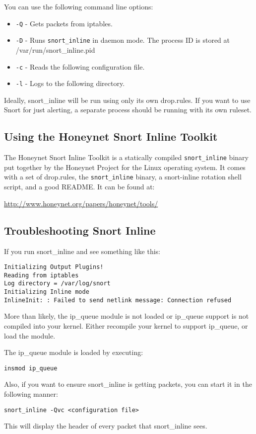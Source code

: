 \documentclass[english]{report}
\begin{document}
You can use the following command line options:
\begin{itemize}
\item \texttt{-Q} - Gets packets from iptables.
\item \texttt{-D} - Runs \texttt{snort\_inline} in daemon mode.  The process ID is stored
                    at /var/run/snort\_inline.pid
\item \texttt{-c} - Reads the following configuration file.
\item \texttt{-l} - Logs to the following directory.

\end{itemize}

Ideally, snort\_inline will be run using only its own drop.rules.  If
you want to use Snort for just alerting, a separate process should be
running with its own ruleset.

\subsection{Using the Honeynet Snort Inline Toolkit}

The Honeynet Snort Inline Toolkit is a statically compiled \texttt{snort\_inline} 
binary put together by the
Honeynet Project for the Linux operating system.  It comes with a set
of drop.rules, the \texttt{snort\_inline} binary, a snort-inline rotation shell
script, and a good README.  It can be found at:

\url{http://www.honeynet.org/papers/honeynet/tools/}

\subsection{Troubleshooting Snort Inline}

If you run snort\_inline and see something like this:
\begin{verbatim}
Initializing Output Plugins!
Reading from iptables
Log directory = /var/log/snort
Initializing Inline mode
InlineInit: : Failed to send netlink message: Connection refused
\end{verbatim}
More than likely, the ip\_queue module is not loaded or ip\_queue 
support is not compiled into your kernel.  Either recompile
your kernel to support ip\_queue, or load the module.

The ip\_queue module is loaded by executing:
\begin{verbatim}
insmod ip_queue
\end{verbatim}
Also, if you want to ensure snort\_inline is getting packets, you can 
start it in the following manner:
\begin{verbatim}
snort_inline -Qvc <configuration file>
\end{verbatim}
This will display the header of every packet that snort\_inline sees. 
\end{document}
